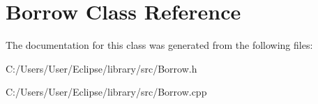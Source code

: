 \hypertarget{class_borrow}{\section{Borrow Class Reference}
\label{class_borrow}
}


The documentation for this class was generated from the following files\+:\begin{DoxyCompactItemize}
\item 
C\+:/\+Users/\+User/\+Eclipse/library/src/Borrow.\+h\item 
C\+:/\+Users/\+User/\+Eclipse/library/src/Borrow.\+cpp\end{DoxyCompactItemize}
